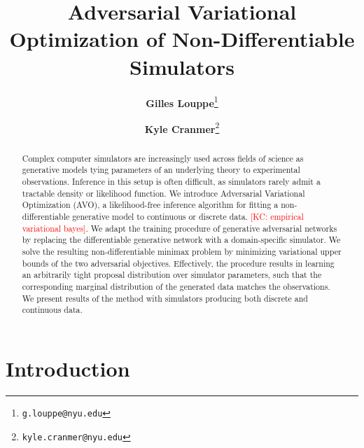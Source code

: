 \documentclass[twocolumn,superscriptaddress,aps]{revtex4-1}
\newcommand{\kcnote}[1]{\textcolor{red}{[KC: #1]}}
\theoremstyle{plain}
\begin{document}

\title{\Large{Adversarial Variational Optimization of Non-Differentiable Simulators}}
\vspace{1cm}
\author{\small{\bf Gilles Louppe}\thanks{\texttt{g.louppe@nyu.edu}}}
\author{\small{\bf Kyle Cranmer}\thanks{\texttt{kyle.cranmer@nyu.edu}}}

\begin{abstract}
Complex computer simulators are increasingly used across fields of science as
generative models tying parameters of an underlying theory to
experimental observations. Inference in this setup is often
difficult, as simulators rarely admit a tractable density or likelihood
function. We introduce Adversarial Variational Optimization (AVO), a likelihood-free
inference algorithm for fitting a non-differentiable generative model to
continuous or discrete  data. \kcnote{empirical variational bayes}. We adapt the training procedure of generative
adversarial networks by replacing the differentiable generative network with a
domain-specific simulator. We solve the resulting non-differentiable
minimax problem by minimizing variational upper bounds of the two adversarial objectives.
Effectively, the procedure results in learning an arbitrarily tight
proposal distribution over simulator parameters, such that the corresponding
marginal distribution of the generated data matches the observations.
We present results of the method with simulators producing both discrete and continuous data.

\end{abstract}

\maketitle


\section{Introduction}

\end{document}
